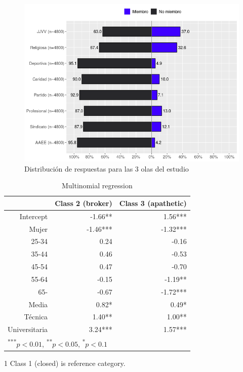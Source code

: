 \begin{figure}[H]
    \centering
    \includegraphics[width=13cm]{output/plot_items.png}
    \caption{Distribución de respuestas para las 3 olas del estudio}
    \label{fig:likert}
\end{figure}


\begin{table}[htp]
\centering
\begin{threeparttable}
\caption{\label{demo-table} Multinomial regression}
\begin{tabular}{rrr}
  \hline
 & Class 2 (broker) & Class 3 (apathetic)\\ 
  \hline
Intercept & -1.66** & 1.56*** \\ 
  Mujer & -1.46*** & -1.32*** \\ 
  25-34 & 0.24 & -0.16 \\ 
  35-44 & 0.46 & -0.53 \\ 
  45-54 & 0.47 & -0.70 \\ 
  55-64 & -0.15 & -1.19** \\ 
  65- & -0.67 & -1.72*** \\ 
  Media & 0.82* & 0.49* \\ 
  Técnica & 1.40** & 1.00** \\ 
  Universitaria & 3.24*** & 1.57*** \\ 
   \hline
\multicolumn{3}{l}{\textsuperscript{***}$p<0.01$, 
  \textsuperscript{**}$p<0.05$, 
  \textsuperscript{*}$p<0.1$}
\end{tabular}
\begin{tablenotes}
    \item[1] Class 1 (closed) is reference category.
  \end{tablenotes}
\end{threeparttable}
\end{table}


